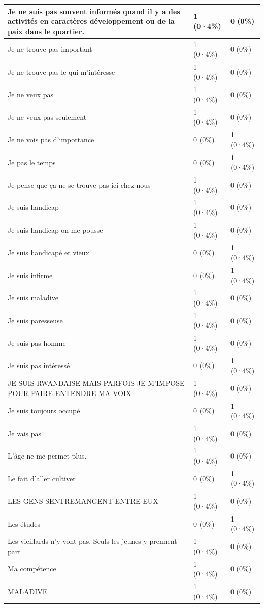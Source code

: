 \documentclass[
]{book}
\begin{document}
\begin{tabular}{l|l|l}
\hline
Je ne suis pas souvent informés quand il y a des activités en caractères développement ou de la paix dans le quartier. & 1 (0·4\%) & 0 (0\%)\\
\hline
Je ne trouve pas important & 1 (0·4\%) & 0 (0\%)\\
\hline
Je ne trouve pas le qui m'intéresse & 1 (0·4\%) & 0 (0\%)\\
\hline
Je ne veux pas & 1 (0·4\%) & 0 (0\%)\\
\hline
Je ne veux pas seulement & 1 (0·4\%) & 0 (0\%)\\
\hline
Je ne vois pas d'importance & 0 (0\%) & 1 (0·4\%)\\
\hline
Je pas le temps & 0 (0\%) & 1 (0·4\%)\\
\hline
Je pense que ça ne se trouve pas ici chez nous & 1 (0·4\%) & 0 (0\%)\\
\hline
Je suis handicap & 1 (0·4\%) & 0 (0\%)\\
\hline
Je suis handicap on me pousse & 1 (0·4\%) & 0 (0\%)\\
\hline
Je suis handicapé et vieux & 0 (0\%) & 1 (0·4\%)\\
\hline
Je suis infirme & 0 (0\%) & 1 (0·4\%)\\
\hline
Je suis maladive & 1 (0·4\%) & 0 (0\%)\\
\hline
Je suis paresseuse & 1 (0·4\%) & 0 (0\%)\\
\hline
Je suis pas homme & 1 (0·4\%) & 0 (0\%)\\
\hline
Je suis pas intéressé & 0 (0\%) & 1 (0·4\%)\\
\hline
JE SUIS RWANDAISE MAIS PARFOIS JE M'IMPOSE POUR FAIRE ENTENDRE MA VOIX & 1 (0·4\%) & 0 (0\%)\\
\hline
Je suis toujours occupé & 0 (0\%) & 1 (0·4\%)\\
\hline
Je vais pas & 1 (0·4\%) & 0 (0\%)\\
\hline
L'âge ne me permet plus. & 1 (0·4\%) & 0 (0\%)\\
\hline
Le fait d'aller cultiver & 0 (0\%) & 1 (0·4\%)\\
\hline
LES  GENS SENTREMANGENT ENTRE EUX & 1 (0·4\%) & 0 (0\%)\\
\hline
Les études & 0 (0\%) & 1 (0·4\%)\\
\hline
Les vieillards n'y vont pas. Seuls les jeunes y prennent part & 1 (0·4\%) & 0 (0\%)\\
\hline
Ma compétence & 1 (0·4\%) & 0 (0\%)\\
\hline
MALADIVE & 1 (0·4\%) & 0 (0\%)\\

\end{tabular}
\end{document}
